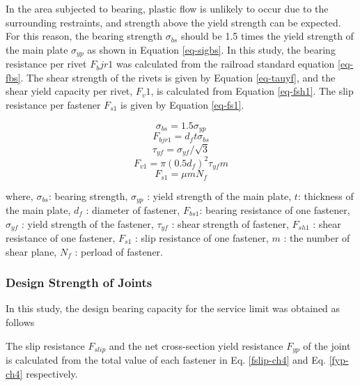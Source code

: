 In the area subjected to bearing, plastic flow is unlikely to occur due to the surrounding restraints, and strength above the yield strength can be expected. For this reason, the bearing strength $\sigma_{bs}$ should be 1.5 times the yield strength of the main plate $\sigma_{yp}$ as shown in Equation \ref{eq-sigbs}. In this study, the bearing resistance per rivet $F_bjr1$ was calculated from the railroad standard equation \ref{eq-fbs}. The shear strength of the rivets is given by Equation \ref{eq-tauyf}, and the shear yield capacity per rivet, $F_v1$, is calculated from Equation \ref{eq-fsh1}. The slip resistance per fastener $F_{s1}$ is given by Equation \ref{eq-fs1}.

\begin{equation}\label{eq-sigbs}
    \sigma_{bs}=1.5\sigma_{yp}
\end{equation}
\begin{equation}\label{eq-fbs}
    F_{bjr1}=d_f t\sigma_{bs}
\end{equation}
\begin{equation}\label{eq-tauyf}
    \tau_{yf}=\sigma_{yf}/\sqrt{3}
\end{equation}
\begin{equation}\label{eq-fsh1}
    F_{v1}=\pi (0.5d_f)^2 \tau_{yf} m
\end{equation}
\begin{equation}\label{eq-fs1}
    F_{s1}=\mu m N_f
\end{equation}

where, $\sigma_{bs}$: bearing strength, $\sigma_{yp}$ : yield strength of the main plate, $t$: thickness of the main plate, $d_f$ : diameter of fastener, $F_{bs1}$: bearing resistance of one fastener, $\sigma_{yf}$ : yield strength of the fastener, $\tau_{yf}$ : shear strength of fastener, $F_{sh1}$ : shear resistance of one fastener, $F_{s1}$ : slip resistance of one fastener, $m$ : the number of shear plane, $N_f$ : perload of fastener.


\subsubsection{Design Strength of Joints}

In this study, the design bearing capacity for the service limit was obtained as follows

The slip resistance $F_{slip}$ and the net cross-section yield resistance 
$F_{yp}$ of the joint is calculated from the total value of each fastener in Eq. \ref{fslip-ch4} and Eq. \ref{fyp-ch4} respectively.


